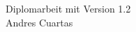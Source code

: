 \begin{titlepage}
\vspace*{7cm}
\begin{center}
\Huge
Diplomarbeit mit 
\vspace{1cm}
\large
Version 1.2\\
\vspace{2cm}
Andres Cuartas\\
\end{center}
\normalsize
\vfill
\end{titlepage}